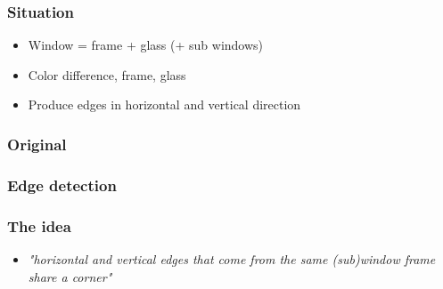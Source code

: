 \documentclass{beamer}
\begin{document}
\frame
{
	\frametitle{Situation}
	\begin{itemize}
	\item <+-| alert@+> Window = frame + glass (+ sub windows)
	\item <+-| alert@+> Color difference, frame, glass
	\item <+-| alert@+> Produce edges in horizontal and vertical direction
	\end{itemize}
}

\frame
{
	\frametitle{Original}
}

\frame
{
	\frametitle{Edge detection}
}



\frame
{
	\frametitle{The idea}
	\begin{itemize}
	\item <+-| alert@+> \emph{"horizontal and vertical edges that come from the same (sub)window frame share a corner"}
	\end{itemize}
}
\end{document}

